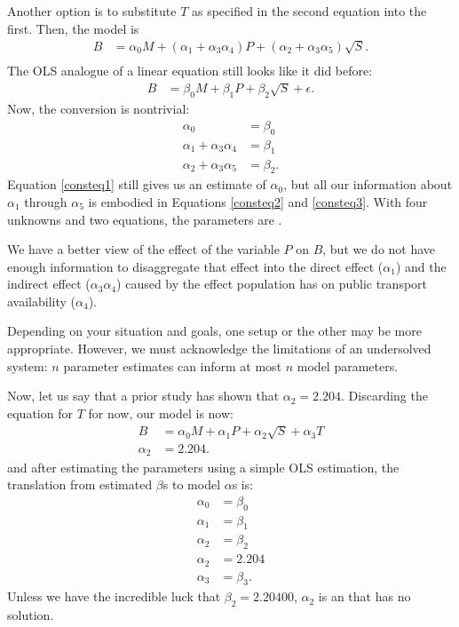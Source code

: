 Another option is to substitute $T$ as specified in the second equation into
the first. Then, the model is
\begin{align*}
B &= \alpha_0 M + (\alpha_1 +\alpha_3 \alpha_4) P + (\alpha_2 + \alpha_3 \alpha_5) \sqrt{S}.\\
\end{align*}
The OLS analogue of a linear equation still looks like it did before:
\begin{align*}
B &= \beta_0 M + \beta_1 P + \beta_2 \sqrt{S} + \epsilon.
\end{align*}
Now, the conversion is nontrivial:
\begin{align}
\alpha_0 &= \beta_0     \label{consteq1}\\
\alpha_1 +\alpha_3 \alpha_4 &= \beta_1        \label{consteq2}\\
\alpha_2 + \alpha_3 \alpha_5 &= \beta_2.       \label{consteq3}
\end{align}
Equation \ref{consteq1} still gives us an estimate of $\alpha_0$,
but all our information about  $\alpha_1$ through $\alpha_5$ is
embodied in Equations \ref{consteq2} and \ref{consteq3}. With four
unknowns and two equations, the parameters are . 

We have a better view of the effect of the variable $P$ on $B$, but we
do not have enough information to disaggregate that effect into the
direct effect ($\alpha_1$) and the indirect effect ($\alpha_3 \alpha_4$)
caused by the effect population has on public transport availability
($\alpha_4$). 

Depending on your situation and goals, one setup or the other may be
more appropriate. However, we must acknowledge the limitations of an
undersolved system: $n$ parameter estimates can inform at most $n$ model
parameters.

Now, let us say that a prior study has shown that $\alpha_2= 2.204$.
Discarding the equation for $T$ for now, our model is now:
\begin{align*}
B &= \alpha_0 M + \alpha_1 P + \alpha_2 \sqrt{S} + \alpha_3 T\\
\alpha_2 &= 2.204.
\end{align*}
and after estimating the parameters using a simple OLS estimation, the 
translation from estimated $\beta$s to model $\alpha$s is:
\begin{align*}
\alpha_0 &= \beta_0\\
\alpha_1 &= \beta_1\\
\alpha_2 &= \beta_2\\
\alpha_2 &= 2.204\\
\alpha_3 &= \beta_3.
\end{align*}
Unless we have the incredible luck that $\beta_2=2.20400$, $\alpha_2$ is an
 that has no solution.


